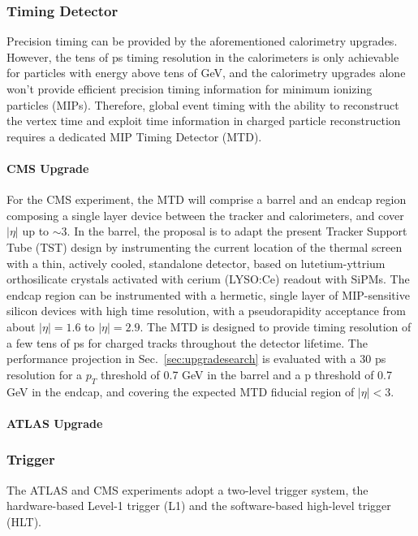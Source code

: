 \subsubsection{Timing Detector} \label{sec:upgradetiming}

Precision timing can be provided by the aforementioned calorimetry upgrades. 
However, the tens of ps timing resolution in the calorimeters is only achievable for particles with energy above tens of GeV, and the calorimetry upgrades alone won't provide efficient precision timing information for minimum ionizing particles (MIPs). 
Therefore, global event timing with the ability to reconstruct the vertex time and exploit time information in charged particle reconstruction requires a dedicated MIP Timing Detector (MTD). 

\paragraph{CMS Upgrade} 
For the CMS experiment, the MTD will comprise a barrel and an endcap region composing a single layer device between the tracker and calorimeters, and cover $|\eta|$ up to $\sim3$. 
In the barrel, the proposal is to adapt the present Tracker Support Tube (TST) design by instrumenting the current location of the thermal screen with a thin, actively cooled, standalone detector, based on lutetium-yttrium orthosilicate crystals activated with cerium (LYSO:Ce) readout with SiPMs.
The endcap region can be instrumented with a hermetic, single layer of MIP-sensitive silicon devices with high time resolution, with a pseudorapidity acceptance from about $|\eta|=1.6$ to $|\eta|=2.9$.
The MTD is designed to provide timing resolution of a few tens of ps for charged tracks throughout the detector lifetime. 
The performance projection in Sec.~\ref{sec:upgradesearch} is evaluated with a 30 ps resolution for a $p_T$ threshold of 0.7 GeV in the barrel and a p threshold of 0.7 GeV in the endcap, and covering the expected MTD fiducial region of $|\eta| < 3$.

\paragraph{ATLAS Upgrade}

\subsubsection{Trigger} \label{sec:upgradetrigger}

The ATLAS and CMS experiments adopt a two-level trigger system, the hardware-based Level-1 trigger (L1) and the software-based high-level trigger (HLT). 

